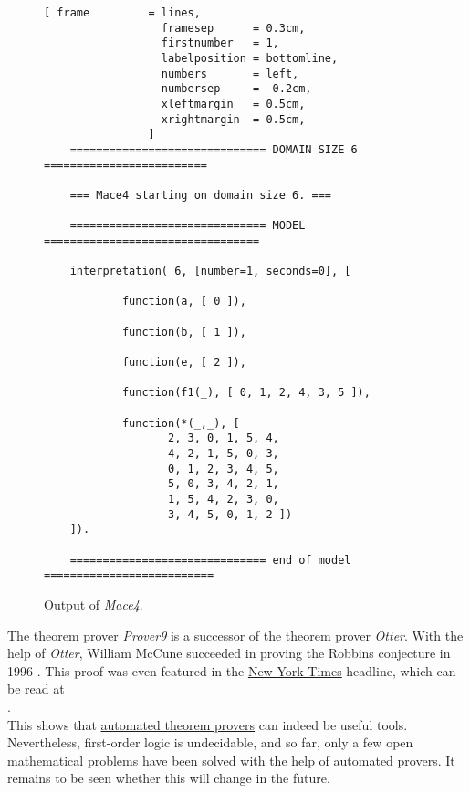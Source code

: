 \begin{figure}[!ht]
\centering
\begin{Verbatim}[ frame         = lines, 
                  framesep      = 0.3cm, 
                  firstnumber   = 1,
                  labelposition = bottomline,
                  numbers       = left,
                  numbersep     = -0.2cm,
                  xleftmargin   = 0.5cm,
                  xrightmargin  = 0.5cm,
                ]
    ============================== DOMAIN SIZE 6 =========================
    
    === Mace4 starting on domain size 6. ===
    
    ============================== MODEL =================================
    
    interpretation( 6, [number=1, seconds=0], [
    
            function(a, [ 0 ]),
    
            function(b, [ 1 ]),
    
            function(e, [ 2 ]),
    
            function(f1(_), [ 0, 1, 2, 4, 3, 5 ]),
    
            function(*(_,_), [
    			   2, 3, 0, 1, 5, 4,
    			   4, 2, 1, 5, 0, 3,
    			   0, 1, 2, 3, 4, 5,
    			   5, 0, 3, 4, 2, 1,
    			   1, 5, 4, 2, 3, 0,
    			   3, 4, 5, 0, 1, 2 ])
    ]).
    
    ============================== end of model ==========================
\end{Verbatim}
\vspace*{-0.3cm}
\caption{Output of \textsl{Mace4}.}
\label{fig:group.out}
\end{figure}

\remarkEng
The theorem prover \textsl{Prover9} is a successor of the theorem prover \textsl{Otter}. With the help of
\textsl{Otter}, William McCune succeeded in proving the Robbins conjecture in 1996 \cite{mccune:1997}. This
proof was even featured in the \href{http://www.nytimes.com/}{New York Times} headline, which can be read at 
\\[0.2cm]
\hspace*{1.3cm}
\href{http://www.nytimes.com/library/cyber/week/1210math.html}{}.
\\[0.2cm]
This shows that \href{https://en.wikipedia.org/wiki/Automated_theorem_proving}{automated theorem provers} can
indeed be useful tools. Nevertheless, first-order logic is undecidable, and so far, only a few open
mathematical problems have been solved with the help of automated provers.  It remains to be seen whether this
will change in the future.
\eox
\pagebreak
\vspace*{\fill}

